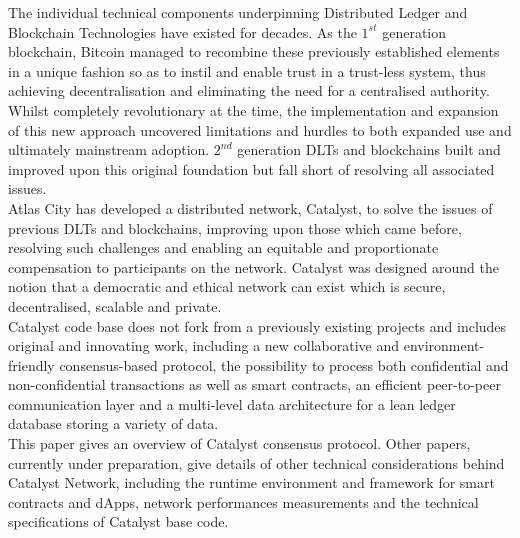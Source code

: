 The individual technical components underpinning Distributed Ledger and Blockchain Technologies have existed for decades. As the $1^{st}$ generation blockchain, Bitcoin managed to recombine these previously established elements in a unique fashion so as to instil and enable trust in a trust-less system, thus achieving decentralisation and eliminating the need for a centralised authority. Whilst completely revolutionary at the time, the implementation and expansion of this new approach uncovered limitations and hurdles to both expanded use and ultimately mainstream adoption. $2^{nd}$ generation DLTs and blockchains built and improved upon this original foundation but fall short of resolving all associated issues. \\
 
Atlas City has developed a distributed network, Catalyst, to solve the issues of previous DLTs and blockchains, improving upon those which came before, resolving such challenges and enabling an equitable and proportionate compensation to participants on the network. Catalyst was designed around the notion that a democratic and ethical network can exist which is secure, decentralised, scalable and private.  \\
 
Catalyst code base does not fork from a previously existing projects and includes original and innovating work, including a new collaborative and environment-friendly consensus-based protocol, the possibility to process both confidential and non-confidential transactions as well as smart contracts, an efficient peer-to-peer communication layer and a multi-level data architecture for a lean ledger database storing a variety of data.\\
 
This paper gives an overview of Catalyst consensus protocol. Other papers, currently under preparation, give details of other technical considerations behind Catalyst Network, including the runtime environment and framework for smart contracts and dApps, network performances measurements and the technical specifications of Catalyst base code. 

